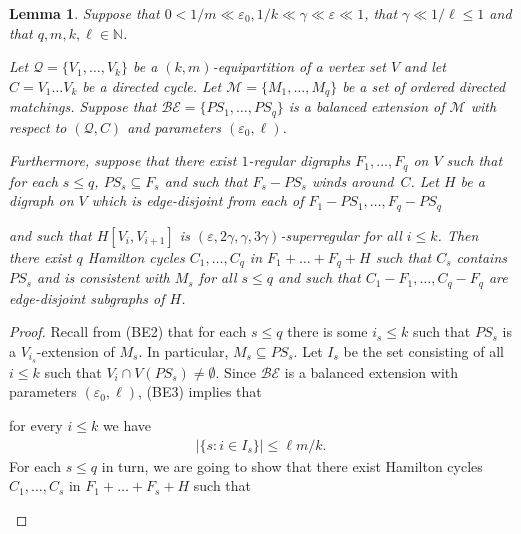 \documentclass{memo-l}
\newtheorem{lemma}[firstthm]{Lemma}
\def\COMMENT#1{}
\def\eps{\varepsilon}
\numberwithin{section}{chapter}
\numberwithin{equation}{section}
\numberwithin{firstthm}{section}
\numberwithin{figure}{section}
\begin{document}
{\begin{lemma}\label{mergecycles2}
Suppose that $0<1/m \ll  \eps_0, 1/k \ll \gamma  \ll \eps   \ll 1$, that $\gamma \ll 1/ \ell \le 1$ and that $q, m,k,\ell \in \mathbb{N}$.%
      \COMMENT{There is actually no condition on $q$ other than that fact that $q \le \ell m$ which is due to balanced extension.}
Let $\mathcal{Q}=\{V_1,\dots,V_k\}$ be a $(k,m)$-equipartition of a vertex set $V$ and let $C=V_1\dots V_k$ be a directed cycle.
Let $\mathcal{M} = \{M_1, \dots, M_q\}$ be a set of ordered directed matchings.
Suppose that $\mathcal{BE}=\{PS_1,\dots,PS_q\}$ is a balanced extension of $\mathcal{M}$ with  respect
to $(\mathcal{Q},C)$ and parameters $(\eps_0, \ell)$.%
    \COMMENT{Daniela: deleted "such that $M_s \subseteq PS_s$ for all $s \le q$" since it follows from (BE2)}
Furthermore, suppose that there exist $1$-regular digraphs $F_1, \dots, F_q $ on $V$ such that for each $s \le q$, $PS_s \subseteq F_s$ and such that
$F_s - PS_s$ winds around~$C$. 
Let $H$ be a digraph on $V$ which is edge-disjoint from each of $F_1 - PS_1, \dots, F_q - PS_q$%
		\COMMENT{Allan: We do not need $F_1-PS_1, \dots, F_s-PS_s$ are edge-disjoint.}
and such that $H[V_{i},V_{i+1}]$ is
$(\eps,2\gamma ,\gamma   , 3 \gamma)$-superregular for all $i\le k$. 
Then there exist $q$ Hamilton cycles $C_1, \dots, C_q$  in
$F_1+ \dots+F_q+H$ such that $C_s$ contains $PS_s$ and is consistent with $M_s$ for all $s \le q$ and such that
$C_1 - F_1, \dots, C_q - F_q$ are edge-disjoint subgraphs of $H$.%
	\COMMENT{Allan: I do mean $C_1 - F_1, \dots, C_q - F_q$ are pairwise edge-disjoint.}
\end{lemma}
\begin{proof}
Recall from (BE2) that for each $s \le q$ there is some $i_s\le k$ such that $PS_s$ is a $V_{i_s}$-extension of $M_s$.
In particular, $M_s\subseteq PS_s$. Let $I_s$ be the set consisting of all $i \le k$ such that $V_i \cap V(PS_s) \ne \emptyset$.
Since $\mathcal{BE}$ is a balanced extension with parameters $(\eps_0, \ell)$, (BE3) implies that%
    \COMMENT{Deryk: deleted $|\{s : i_s = i\}| \le \ell m/k$ in the display below since it is not used}
for every $i \le k$ we have
\begin{align} \label{sbound}
|\{s : i \in I_s\}| \le \ell m/k.
\end{align}
For each $s\le q$ in turn, we are going to show that there exist Hamilton cycles $C_{1}, \dots, C_{s}$ in $F_1 + \dots + F_s+H$ such that 
\begin{itemize}

\end{itemize}
\end{proof}}
\end{document}

